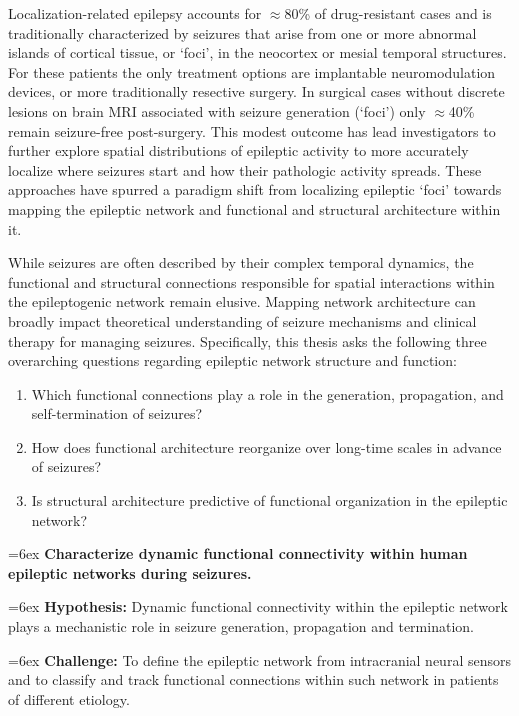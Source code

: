 Localization-related epilepsy accounts for $\approx$80\% of drug-resistant cases and is traditionally characterized by seizures that arise from one or more abnormal islands of cortical tissue, or `foci', in the neocortex or mesial temporal structures. For these patients the only treatment options are implantable neuromodulation devices, or more traditionally resective surgery. In surgical cases without discrete lesions on brain MRI associated with seizure generation (`foci') only $\approx$40\% remain seizure-free post-surgery. This modest outcome has lead investigators to further explore spatial distributions of epileptic activity to more accurately localize where seizures start and how their pathologic activity spreads. These approaches have spurred a paradigm shift from localizing epileptic ‘foci’ towards mapping the epileptic network and functional and structural architecture within it.

While seizures are often described by their complex temporal dynamics, the functional and structural connections responsible for spatial interactions within the epileptogenic network remain elusive. Mapping network architecture can broadly impact theoretical understanding of seizure mechanisms and clinical therapy for managing seizures.
Specifically, this thesis asks the following three overarching questions regarding epileptic network structure and function:
\begin{enumerate}[topsep=1ex, itemsep=0pt]
    \item Which functional connections play a role in the generation, propagation, and self-termination of seizures?
    \item How does functional architecture reorganize over long-time scales in advance of seizures?
    \item Is structural architecture predictive of functional organization in the epileptic network?
\end{enumerate}

\hangindent=6ex
\noindent
{} \textbf{Characterize dynamic functional connectivity within human epileptic networks during seizures.}

\hangindent=6ex
\textbf{Hypothesis:} Dynamic functional connectivity within the epileptic network plays a mechanistic role in seizure generation, propagation and termination.

\hangindent=6ex
\textbf{Challenge:} To define the epileptic network from intracranial neural sensors and to classify and track functional connections within such network in patients of different etiology.

